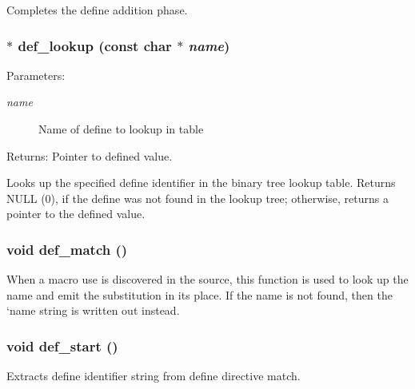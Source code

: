 Completes the define addition phase. 
\subsubsection{$\ast$ def\_\-lookup (const char $\ast$ {\em name})\hspace{0.3cm}{\tt  [static]}}\label{pplexer_8c_a142}


\begin{Desc}
\item[Parameters:]
\begin{description}
\item[{\em name}]Name of define to lookup in table\end{description}
\end{Desc}
\begin{Desc}
\item[Returns:]Pointer to defined value.\end{Desc}
Looks up the specified define identifier in the binary tree lookup table. Returns NULL (0), if the define was not found in the lookup tree; otherwise, returns a pointer to the defined value. 
\subsubsection{\setlength{\rightskip}{0pt plus 5cm}void def\_\-match ()\hspace{0.3cm}{\tt  [static]}}\label{pplexer_8c_a130}


When a macro use is discovered in the source, this function is used to look up the name and emit the substitution in its place. If the name is not found, then the `name string is written out instead. 
\subsubsection{\setlength{\rightskip}{0pt plus 5cm}void def\_\-start ()\hspace{0.3cm}{\tt  [static]}}\label{pplexer_8c_a131}


Extracts define identifier string from define directive match. 
